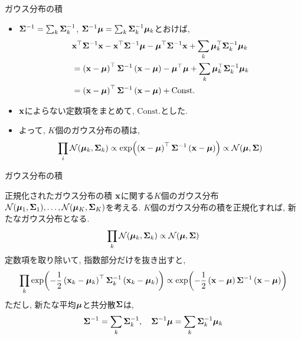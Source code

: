 \documentclass[dvipdfmx,notheorems,t]{beamer}
\begin{document}
\begin{frame}{ガウス分布の積}
\begin{itemize}
  \item $\vb{\Sigma}^{-1} = \sum_k \vb{\Sigma}_k^{-1}$,
  $\vb{\Sigma}^{-1} \vb*{\mu} = \sum_k \vb{\Sigma}_k^{-1} \vb*{\mu}_k$とおけば,
  \begin{align*}
    & \vb{x}^\top \vb{\Sigma}^{-1} \vb{x}
      - \vb{x}^\top \vb{\Sigma}^{-1} \vb*{\mu}
      - \vb*{\mu}^\top \vb{\Sigma}^{-1} \vb{x}
      + \sum_k \vb*{\mu}_k^\top \vb{\Sigma}_k^{-1} \vb*{\mu}_k \\
    &= \left( \vb{x} - \vb*{\mu} \right)^\top \vb{\Sigma}^{-1} \left( \vb{x} - \vb*{\mu} \right)
      - \vb*{\mu}^\top \vb*{\mu}
      + \sum_k \vb*{\mu}_k^\top \vb{\Sigma}_k^{-1} \vb*{\mu}_k \\
    &= \left( \vb{x} - \vb*{\mu} \right)^\top \vb{\Sigma}^{-1} \left( \vb{x} - \vb*{\mu} \right)
      + \mathrm{Const.}
  \end{align*}
  \item $\vb{x}$によらない定数項をまとめて, $\mathrm{Const.}$とした.
  \item よって, $K$個のガウス分布の積は,
  \begin{align*}
    \prod_i \mathcal{N}(\vb*{\mu}_k, \vb{\Sigma}_k)
    \propto \exp(\left( \vb{x} - \vb*{\mu} \right)^\top \vb{\Sigma}^{-1} \left( \vb{x} - \vb*{\mu} \right))
    \propto \mathcal{N}(\vb*{\mu}, \vb{\Sigma})
  \end{align*}
\end{itemize}
\end{frame}

\begin{frame}{ガウス分布の積}
\begin{block}{正規化されたガウス分布の積}
  $\vb{x}$に関する$K$個のガウス分布$\mathcal{N}(\vb*{\mu}_1, \vb{\Sigma}_1), \ldots,
    \mathcal{N}(\vb*{\mu}_K, \vb{\Sigma}_K)$を考える.
  $K$個のガウス分布の積を正規化すれば, 新たなガウス分布となる.
  \begin{align*}
    \prod_k \mathcal{N}(\vb*{\mu}_k, \vb{\Sigma}_k) \propto \mathcal{N}(\vb*{\mu}, \vb{\Sigma})
  \end{align*}
  定数項を取り除いて, 指数部分だけを抜き出すと,
  {\small \begin{align*}
    \prod_k \exp(-\frac{1}{2} \left( \vb{x}_k - \vb*{\mu}_k \right)^\top \vb{\Sigma}_k^{-1}
      \left( \vb{x}_k - \vb*{\mu}_k \right))
    \propto \exp(-\frac{1}{2} \left( \vb{x} - \vb*{\mu} \right) \vb{\Sigma}^{-1}
      \left( \vb{x} - \vb*{\mu} \right))
  \end{align*}}
  ただし, 新たな平均$\vb*{\mu}$と共分散$\vb{\Sigma}$は,
  \begin{align*}
    \vb{\Sigma}^{-1} = \sum_k \vb{\Sigma}_k^{-1}, \quad
    \vb{\Sigma}^{-1} \vb*{\mu} = \sum_k \vb{\Sigma}_k^{-1} \vb*{\mu}_k
  \end{align*}
\end{block}
\end{frame}
\end{document}
